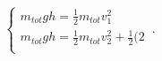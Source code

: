 \begin{equation}
    \begin{cases}
      m_{tot} g h = \frac{1}{2} m_{tot} v_1^2\\
      m_{tot} g h = \frac{1}{2} m_{tot} v_2^2 + \frac{1}{2}(2\\
    \end{cases}\,.
\end{equation}